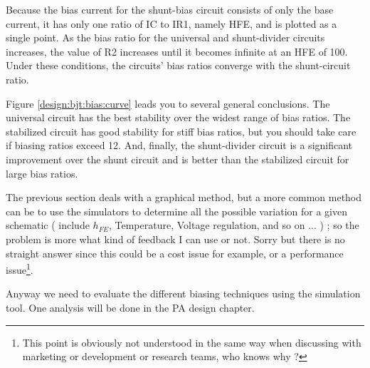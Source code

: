 \bigskip
Because the bias current for the shunt-bias circuit consists of only the base current, it has only one ratio of IC to IR1, namely HFE, and is plotted as a single point. As the bias ratio for the universal and shunt-divider circuits increases, the value of R2 increases until it becomes infinite at an HFE of 100. Under these conditions, the circuits' bias ratios converge with the shunt-circuit ratio.

\bigskip
Figure \ref{design:bjt:bias:curve} leads you to several general conclusions. The universal circuit has the best stability over the widest range of bias ratios. The stabilized circuit has good stability for stiff bias ratios, but you should take care if biasing ratios exceed 12. And, finally, the shunt-divider circuit is a significant improvement over the shunt circuit and is better than the stabilized circuit for large bias ratios.


The previous section deals with a graphical method, but a more common method can be to use the simulators to determine all the possible variation for a given schematic ( include $h_{FE}$, Temperature, Voltage regulation, and so on ... ) ; so the problem is more what kind of feedback I can use or not. Sorry but there is no straight answer since this could be a cost issue for example, or a performance issue\footnote{This point is obviously not understood in the same way when discussing with marketing or development or research teams, who knows why ?}.

\bigskip

Anyway we need to evaluate the different biasing techniques using the simulation tool. One analysis will be done in the PA design chapter.
